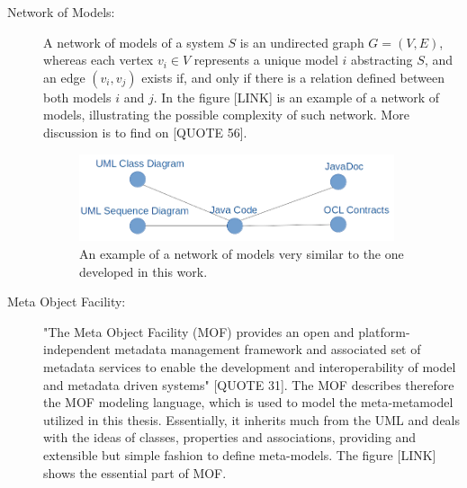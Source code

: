 \documentclass[tuberlin,cic,tc,openright,english,noabntcite]{iiufrgs}
\begin{document}
\begin{description}
\item[Network of Models:] A network of models of a system $S$ is an undirected graph $G = (V,E)$, whereas each vertex $v_i \in V$ represents a unique model $i$ abstracting $S$, and an edge $(v_i, v_j)$ exists if, and only if there is a relation defined between both models $i$ and $j$. In the figure [LINK] is an example of a network of models, illustrating the possible complexity of such network. More discussion is to find on [QUOTE 56].

\begin{figure}[h]
    \caption{An example of a network of models very similar to the one developed in this work.}
    \begin{center}
        \includegraphics[width=25em]{network_example_01}   
    \end{center}
    \label{fig:network_example_01}
\end{figure}

\item[Meta Object Facility:] "The Meta Object Facility (MOF) provides an open and platform-independent metadata management framework and associated set of metadata services to enable the development and interoperability of model and metadata driven systems" [QUOTE 31]. The MOF describes therefore the MOF modeling language, which is used to model the meta-metamodel utilized in this thesis. Essentially, it inherits much from the UML and deals with the ideas of classes, properties and associations, providing and extensible but simple fashion to define meta-models. The figure [LINK] shows the essential part of MOF.


\end{description}
\end{document}
